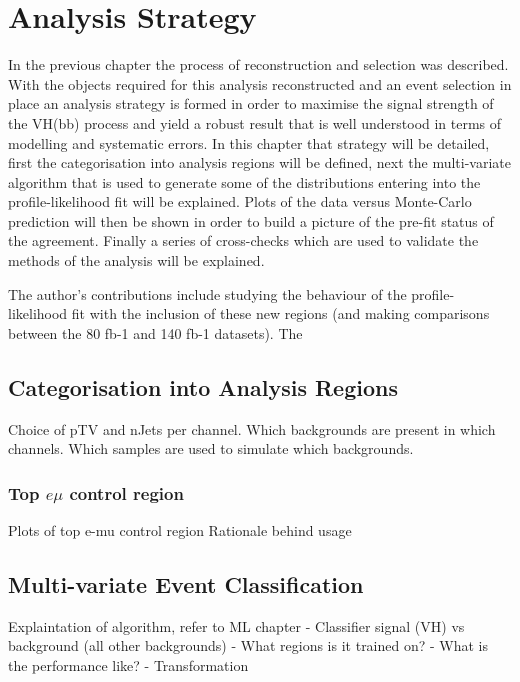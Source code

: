 \chapter{Analysis Strategy}%
\label{ch:strategy}
In the previous chapter the process of reconstruction and selection was
described. With the objects required for this analysis reconstructed and an
event selection in place an analysis strategy is formed in order to maximise the
signal strength of the VH(bb) process and yield a robust result that is well
understood in terms of modelling and systematic errors. In this chapter that
strategy will be detailed, first the categorisation into analysis regions will
be defined, next the multi-variate algorithm that is used to generate some of
the distributions entering into the profile-likelihood fit will be explained.
Plots of the data versus Monte-Carlo prediction will then be shown in order to
build a picture of the pre-fit status of the agreement. Finally a series of
cross-checks which are used to validate the methods of the analysis will be
explained.

The author's contributions include studying the behaviour of the
profile-likelihood fit with the inclusion of these new regions (and making
comparisons between the 80 fb-1 and 140 fb-1 datasets). The 

\section{Categorisation into Analysis Regions}
\label{sec:ana-regions}
Choice of pTV and nJets per channel.
Which backgrounds are present in which channels.
Which samples are used to simulate which backgrounds.


\subsection{Top \texorpdfstring{$e \mu$}{e mu} control region}%
\label{sec:topemucr}
Plots of top e-mu control region
Rationale behind usage


\section{Multi-variate Event Classification}%
\label{sec:mva}
Explaintation of algorithm, refer to ML chapter
- Classifier signal (VH) vs background (all other backgrounds)
- What regions is it trained on?
- What is the performance like?
- Transformation




